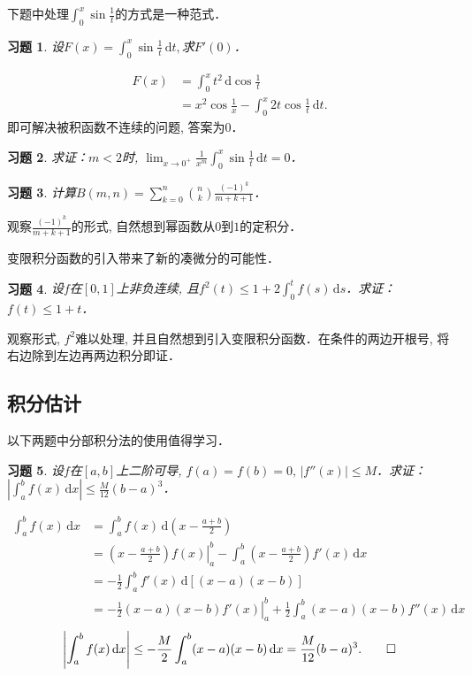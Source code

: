 \documentclass[11pt,a4paper]{ctexart}
\makeatletter
\theoremstyle{thmseries} %
\theoremstyle{exerseries}
\newtheorem{exer}{习题}[section]
\renewenvironment{proof}[1][\proofname]{\par
  \pushQED{\qed}%
  \normalfont \topsep6\p@\@plus6\p@\relax
  \trivlist
  \item[\hskip\labelsep
        \itshape
    #1\@addpunct{}]\ignorespaces
}{%
  \popQED\endtrivlist\@endpefalse
}
\newenvironment{sol}{\begin{proof}[\bfseries\upshape 解\quad]}{\end{proof}}
\newenvironment{pf}{\begin{proof}[\bfseries\upshape 证\quad]}{\end{proof}}
\newcommand{\bra}[1]{\mathopen{}\left(#1\right)}
\renewcommand{\d}{\mathrm{d}}
\makeatother
\begin{document}
下题中处理$\int_{0}^{x}\sin\frac{1}{t}$的方式是一种范式．
\begin{exer}
	设$F(x)=\int_{0}^{x}\sin\frac{1}{t}\,\d t,$求$F'(0)$．
\end{exer}
\begin{sol}
	\begin{align*}
		F(x)&=\int_{0}^{x}t^2\,\d\cos\frac{1}{t}\\
		&=x^2\cos\frac{1}{x}-\int_{0}^{x}2t\cos\frac{1}{t}\,\d t.
	\end{align*}
	即可解决被积函数不连续的问题, 答案为$0$．
\end{sol}

\begin{exer}
	求证：$m<2$时, $\lim_{x\to0^+}\frac{1}{x^m}\int_{0}^{x}\sin\frac{1}{t}\,\d t=0$．
\end{exer}

\begin{exer}
	计算$B(m,n)=\sum_{k=0}^{n}\binom{n}{k}\frac{(-1)^k}{m+k+1}$．
\end{exer}
\begin{sol}
	观察$\frac{(-1)^k}{m+k+1}$的形式, 自然想到幂函数从$0$到$1$的定积分．
\end{sol}

变限积分函数的引入带来了新的凑微分的可能性．
\begin{exer}
	设$f$在$[0,1]$上非负连续, 且$f^2(t)\leq1+2\int_{0}^{t}f(s)\,\d s$．求证：$f(t)\leq1+t$．
\end{exer}
\begin{pf}
	观察形式, $f^2$难以处理, 并且自然想到引入变限积分函数．在条件的两边开根号, 将右边除到左边再两边积分即证．
\end{pf}


\subsection{积分估计}
以下两题中分部积分法的使用值得学习．
\begin{exer}
	设$f$在$[a,b]$上二阶可导, $f(a)=f(b)=0,\,|f''(x)|\leq M$．求证：$\left|\int_{a}^{b}f(x)\,\d x\right|\leq\frac{M}{12}(b-a)^3$．	
\end{exer}
\begin{pf}
	\begin{align*}
		\int_{a}^{b}f(x)\,\d x&=\int_{a}^{b}f(x)\,\d\bra{x-\frac{a+b}{2}}\\
		&=\left.\bra{x-\frac{a+b}{2}}f(x)\right|_a^b-\int_{a}^{b}\bra{x-\frac{a+b}{2}}f'(x)\,\d x\\
		&=-\frac{1}{2}\int_{a}^{b}f'(x)\,\d[(x-a)(x-b)]\\
		&=\left.-\frac{1}{2}(x-a)(x-b)f'(x)\right|_a^b+\frac{1}{2}\int_{a}^{b}(x-a)(x-b)f''(x)\,\d x
	\end{align*}
	\[\left|\int_{a}^{b}f(x)\,\d x\right|\leq-\frac{M}{2}\int_{a}^{b}(x-a)(x-b)\,\d x=\frac{M}{12}(b-a)^3.\qedhere\]
\end{pf}
\end{document}
